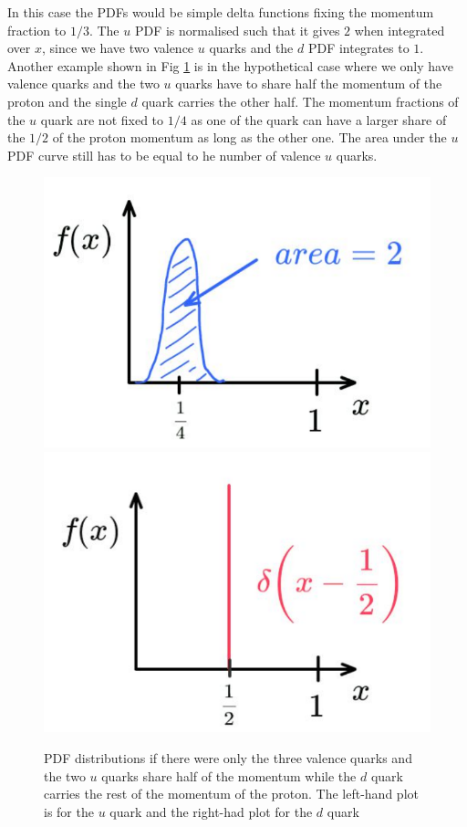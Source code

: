 \documentclass[12pt]{article}
\begin{document}
In this case the PDFs would be simple delta functions fixing the momentum fraction to $1/3$. The $u$ PDF is normalised such that it gives $2$ when integrated over $x$, since we have two valence $u$ quarks and the $d$ PDF integrates to $1$. Another example shown in Fig \ref{fig:pdfcd} is in the hypothetical case where we only have valence quarks and the two $u$ quarks have to share half the momentum of the proton and the single $d$ quark carries the other half. The momentum fractions of the $u$ quark are not fixed to $1/4$ as one of the quark can have a larger share of the $1/2$ of the proton momentum as long as the other one. The area under the $u$ PDF curve still has to be equal to he number of valence $u$ quarks.  
\begin{figure}[h]
\begin{center}
  \includegraphics[scale=0.25]{images/PDFc.png}
    \includegraphics[scale=0.25]{images/PDFd.png}
\end{center}
  \caption{PDF distributions if there were only the three valence quarks and the two $u$ quarks share half of the momentum while the $d$ quark carries the rest of the momentum of the proton. The left-hand plot is for the $u$ quark and the right-had plot for the $d$ quark }
  \label{fig:pdfcd}
  \end{figure}
\end{document}

